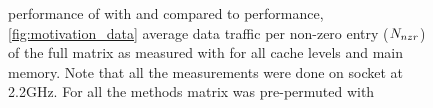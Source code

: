   \begin{figure}[thbp]
  	\centering
    \hspace{1em}
  	
  	\caption{ performance of \SymmSpmv with \MC and \ABMC compared to \SpMV performance, \cref{fig:motivation_data} average data traffic per non-zero entry ($N_{nzr}$) of the full matrix as measured with \LIKWID for all cache levels and main memory. Note that all the measurements were done on \IVB socket at 2.2GHz. For all the methods matrix was pre-permuted with \RCM }
  	\label{fig:motivation}
  \end{figure}
 
